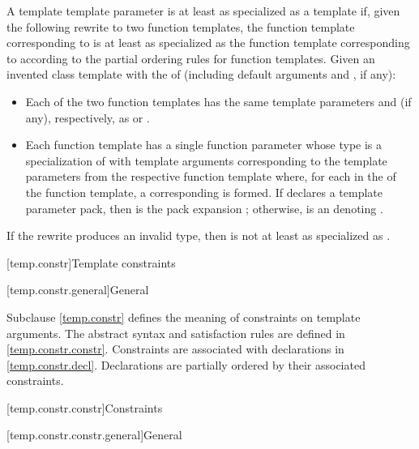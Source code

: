 \pnum
A template template parameter  is
at least as specialized as a template  
if, given the following rewrite to two function templates,
the function template corresponding to 
is at least as specialized as
the function template corresponding to 
according to the partial ordering rules
for function templates.
Given an invented class template 
with the  of  (including default arguments
and , if any):

\begin{itemize}
\item
Each of the two function templates has the same template parameters
and  (if any),
respectively, as  or .
\item
Each function template has a single function parameter
whose type is a specialization of 
with template arguments corresponding to the template parameters
from the respective function template where,
for each  
in the  of the function template,
a corresponding   is formed.
If  declares a template parameter pack,
then  is the pack expansion ;
otherwise,  is an  denoting .
\end{itemize}
If the rewrite produces an invalid type,
then  is not at least as specialized as .

[temp.constr]{Template constraints}

[temp.constr.general]{General}

\pnum
\begin{note}
Subclause \ref{temp.constr} defines the meaning of constraints on template arguments.
The abstract syntax and satisfaction rules are defined
in \ref{temp.constr.constr}.
Constraints are associated with declarations in \ref{temp.constr.decl}.
Declarations are partially ordered by their associated constraints.
\end{note}

[temp.constr.constr]{Constraints}

[temp.constr.constr.general]{General}

%


